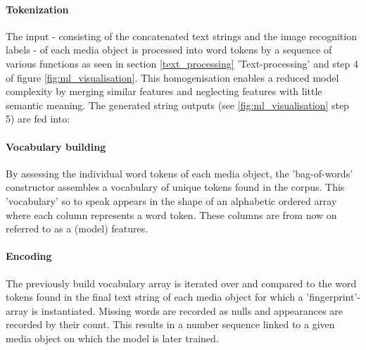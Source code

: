 \paragraph*{Tokenization} The input - consisting of the concatenated text strings and the image recognition labels - of each media object is processed into word tokens by a sequence of various functions as seen in section \ref{text_processing} 'Text-processing' and step 4 of figure \ref{fig:ml_visualisation}. This homogenisation enables a reduced model complexity by merging similar features and neglecting features with little semantic meaning. The generated string outputs (see \ref{fig:ml_visualisation} step 5) are fed into:

\paragraph*{Vocabulary building} By assessing the individual word tokens of each media object, the 'bag-of-words' constructor assembles a vocabulary of unique tokens found in the corpus. This 'vocabulary' so to speak appears in the shape of an alphabetic ordered array where each column represents a word token. These columns are from now on referred to as a (model) features.

\paragraph*{Encoding} The previously build vocabulary array is iterated over and compared to the word tokens found in the final text string of each media object for which a 'fingerprint'-array is instantiated. Missing words are recorded as nulls and appearances are recorded by their count. This results in a number sequence linked to a given media object on which the model is later trained.

\vspace{2cm}

